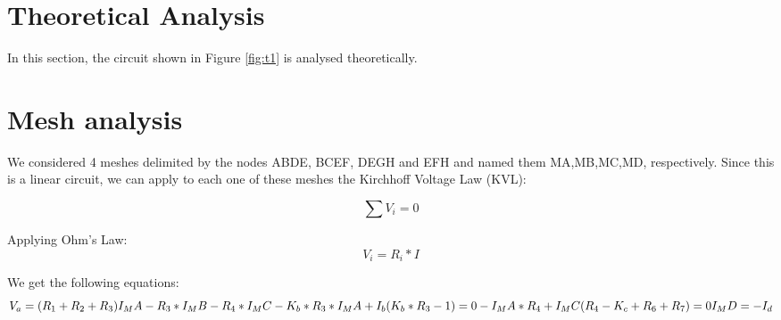 \section{Theoretical Analysis}
\label{sec:analysis}

In this section, the circuit shown in Figure \ref{fig:t1} is analysed
theoretically.

\section{Mesh analysis}
We considered 4 meshes delimited by the nodes ABDE, BCEF, DEGH and EFH and named them MA,MB,MC,MD, respectively. Since this is a linear circuit, we can apply to each one of these meshes the Kirchhoff Voltage Law (KVL):


\begin{equation}
  \sum V_i = 0
  \label{eq:KVL}
\end{equation}

Applying Ohm's Law:
\begin{equation}
  V_i= R_i * I
  \label{eq:OhmLaw}
\end{equation}

We get the following equations:
\begin{equation}
    
    V_a = (R_1+R_2+R_3)I_MA - R_3*I_MB - R_4*I_MC\\
  
    -K_b*R_3*I_MA + I_b(K_b*R_3-1)=0\\
  
    -I_MA*R_4 + I_MC(R_4-K_c+R_6+R_7)=0\\
   
    I_MD= -I_d

  \label{eq:malhas}
\end{equation}

